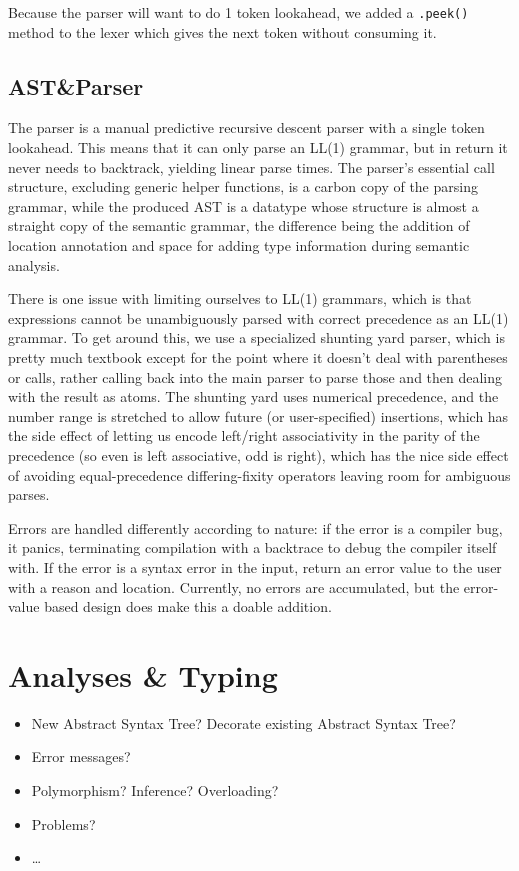\documentclass{report}
\begin{document}
Because the parser will want to do 1 token lookahead, we added a
\texttt{.peek()} method to the lexer which gives the next token without
consuming it.

\section{AST\&Parser}
The parser is a manual predictive recursive descent parser with a single token
lookahead. This means that it can only parse an LL(1) grammar, but in return it
never needs to backtrack, yielding linear parse times. The parser's essential
call structure, excluding generic helper functions, is a carbon copy of the
parsing grammar, while the produced AST is a datatype whose structure is almost
a straight copy of the semantic grammar, the difference being the addition of
location annotation and space for adding type information during semantic
analysis.

There is one issue with limiting ourselves to LL(1) grammars, which is that
expressions cannot be unambiguously parsed with correct precedence as an LL(1)
grammar. To get around this, we use a specialized shunting yard parser, which is
pretty much textbook except for the point where it doesn't deal with
parentheses or calls, rather calling back into the main parser to parse those
and then dealing with the result as atoms. The shunting yard uses numerical
precedence, and the number range is stretched to allow future (or
user-specified) insertions, which has the side effect of letting us encode
left/right associativity in the parity of the precedence (so even is left
associative, odd is right), which has the nice side effect of avoiding
equal-precedence differing-fixity operators leaving room for ambiguous parses.

Errors are handled differently according to nature: if the error is a compiler
bug, it panics, terminating compilation with a backtrace to debug the compiler
itself with. If the error is a syntax error in the input, return an error value
to the user with a reason and location. Currently, no errors are accumulated,
but the error-value based design does make this a doable addition.


\chapter{Analyses \& Typing}
\begin{itemize}
	\item New Abstract Syntax Tree? Decorate existing Abstract Syntax Tree?
	\item Error messages?
	\item Polymorphism? Inference? Overloading?
	\item Problems?
	\item\ldots
\end{itemize}
\end{document}
